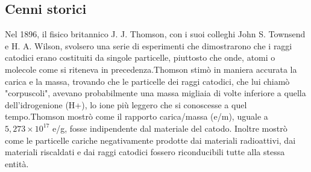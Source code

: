 \subsection{Cenni storici}
Nel 1896, il fisico britannico J. J. Thomson, con i suoi colleghi John S. Townsend e H. A. Wilson, svolsero una serie di esperimenti che dimostrarono che i raggi catodici erano costituiti da singole particelle, piuttosto che onde, atomi o molecole come si riteneva in precedenza.Thomson stimò in maniera accurata la carica e la massa, trovando che le particelle dei raggi catodici, che lui chiamò "corpuscoli", avevano probabilmente una massa migliaia di volte inferiore a quella dell'idrogenione (H+), lo ione più leggero che si conoscesse a quel tempo.Thomson mostrò come il rapporto carica/massa (e/m), uguale a $5,273 \times 10^17$  e/g, fosse indipendente dal materiale del catodo. Inoltre mostrò come le particelle cariche negativamente prodotte dai materiali radioattivi, dai materiali riscaldati e dai raggi catodici fossero riconducibili tutte alla stessa entità.
